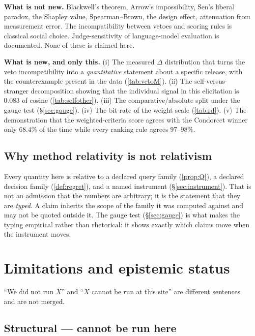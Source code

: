 \textbf{What is not new.} Blackwell's theorem, Arrow's impossibility, Sen's
liberal paradox, the Shapley value, Spearman--Brown, the design effect,
attenuation from measurement error. The incompatibility between vetoes and
scoring rules is classical social choice. Judge-sensitivity of language-model
evaluation is documented. None of these is claimed here.

\textbf{What is new, and only this.} (i) The measured $\Delta$ distribution that
turns the veto incompatibility into a \emph{quantitative} statement about a
specific release, with the counterexample present in the data
(\cref{tab:vetoM}). (ii) The self-versus-stranger decomposition showing that the
individual signal in this elicitation is $0.083$ of cosine (\cref{tab:selfother}).
(iii) The comparative/absolute split under the gauge test (§\ref{sec:gauge}).
(iv) The bit-rate of the weight scale (\cref{tab:rd}). (v) The demonstration that
the weighted-criteria score agrees with the Condorcet winner only $68.4\%$ of the
time while every ranking rule agrees $97$--$98\%$.

\subsection{Why method relativity is not relativism}

Every quantity here is relative to a declared query family
(\cref{prop:Q}), a declared decision family (\cref{def:regret}), and a named
instrument (§\ref{sec:instrument}). That is not an admission that the numbers are
arbitrary; it is the statement that they are \emph{typed}. A claim inherits the
scope of the family it was computed against and may not be quoted outside it.
The gauge test (§\ref{sec:gauge}) is what makes the typing empirical rather than
rhetorical: it shows exactly which claims move when the instrument moves.

\section{Limitations and epistemic status}
\label{sec:limits}

``We did not run $X$'' and ``$X$ cannot be run at this site'' are different
sentences and are not merged.

\subsection{Structural --- cannot be run here}

